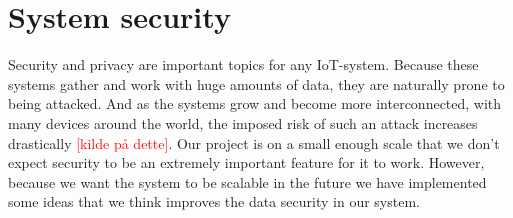 \section{System security}
Security and privacy are important topics for any IoT-system. Because these systems gather and work with huge amounts of data, they are naturally prone to being attacked. And as the systems grow and become more interconnected, with many devices around the world, the imposed risk of such an attack increases drastically \textcolor{red}{[kilde på dette]}. Our project is on a small enough scale that we don’t expect security to be an extremely important feature for it to work. However, because we want the system to be scalable in the future we have implemented some ideas that we think improves the data security in our system. 

